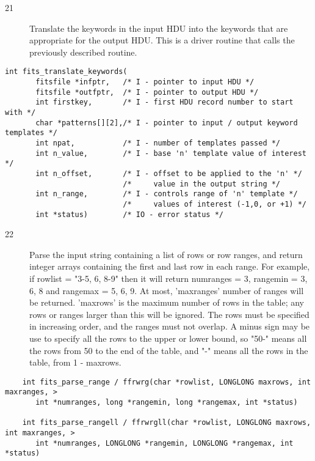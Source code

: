 \documentclass[11pt]{book}
\begin{document}
\begin{description}
\item[21]  Translate the keywords in the input HDU into the keywords that are
appropriate for the output HDU.  This is a driver routine that calls
the previously described routine.
\end{description}

\begin{verbatim}
int fits_translate_keywords(
	   fitsfile *infptr,   /* I - pointer to input HDU */
	   fitsfile *outfptr,  /* I - pointer to output HDU */
	   int firstkey,       /* I - first HDU record number to start with */
	   char *patterns[][2],/* I - pointer to input / output keyword templates */
	   int npat,           /* I - number of templates passed */
	   int n_value,        /* I - base 'n' template value of interest */
	   int n_offset,       /* I - offset to be applied to the 'n' */
 	                       /*     value in the output string */
	   int n_range,        /* I - controls range of 'n' template */
	                       /*     values of interest (-1,0, or +1) */
	   int *status)        /* IO - error status */
\end{verbatim}


\begin{description}
\item[22]  Parse the input string containing a list of rows or row ranges, and
     return integer arrays containing the first and last row in each
     range.  For example, if rowlist = "3-5, 6, 8-9" then it will
     return numranges = 3, rangemin = 3, 6, 8 and rangemax = 5, 6, 9.
     At most, 'maxranges' number of ranges will be returned.  'maxrows'
     is the maximum number of rows in the table; any rows or ranges
     larger than this will be ignored.  The rows must be specified in
     increasing order, and the ranges must not overlap. A minus sign
     may be use to specify all the rows to the upper or lower bound, so
     "50-" means all the rows from 50 to the end of the table, and "-"
     means all the rows in the table, from 1 - maxrows.
   \label{ffrwrg}
\end{description}

\begin{verbatim}
    int fits_parse_range / ffrwrg(char *rowlist, LONGLONG maxrows, int maxranges, >
       int *numranges, long *rangemin, long *rangemax, int *status)

    int fits_parse_rangell / ffrwrgll(char *rowlist, LONGLONG maxrows, int maxranges, >
       int *numranges, LONGLONG *rangemin, LONGLONG *rangemax, int *status)
\end{verbatim}
\end{document}
